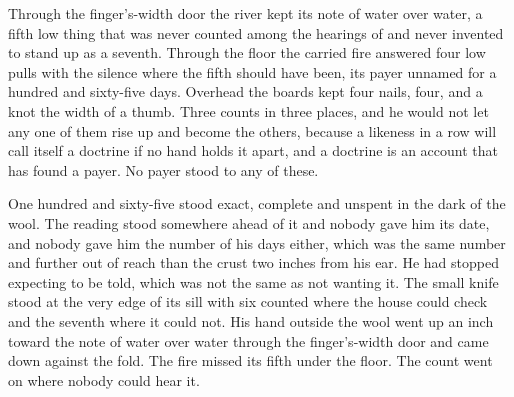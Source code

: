 Through the finger's-width door the river kept its note of water over water, a fifth low thing that was never counted among the hearings of  and never invented to stand up as a seventh. Through the floor the carried fire answered four low pulls with the silence where the fifth should have been, its payer unnamed for a hundred and sixty-five days. Overhead the boards kept four nails, four, and a knot the width of a thumb. Three counts in three places, and he would not let any one of them rise up and become the others, because a likeness in a row will call itself a doctrine if no hand holds it apart, and a doctrine is an account that has found a payer. No payer stood to any of these.

One hundred and sixty-five stood exact, complete and unspent in the dark of the wool. The reading stood somewhere ahead of it and nobody gave him its date, and nobody gave him the number of his days either, which was the same number and further out of reach than the crust two inches from his ear. He had stopped expecting to be told, which was not the same as not wanting it. The small knife stood at the very edge of its sill with six counted where the house could check and the seventh where it could not. His hand outside the wool went up an inch toward the note of water over water through the finger's-width door and came down against the fold. The fire missed its fifth under the floor. The count went on where nobody could hear it.
